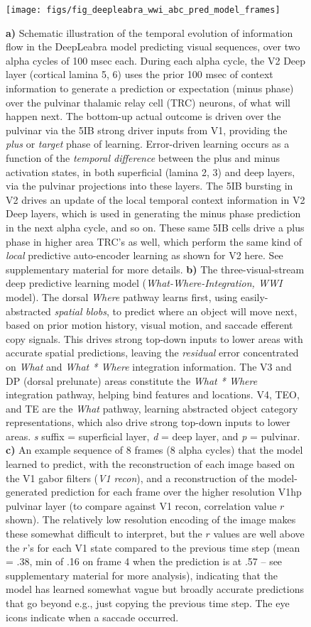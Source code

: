 \documentclass[12pt,twoside]{article}
\newif\myifpdf
\begin{document}
\begin{figure}
  \centering\texttt{[image: figs/fig\_deepleabra\_wwi\_abc\_pred\_model\_frames]}
  \caption{\small {\bf a)} Schematic illustration of the temporal evolution of information flow in the DeepLeabra model predicting visual sequences, over two alpha cycles of 100 msec each.  During each alpha cycle, the V2 Deep layer (cortical lamina 5, 6) uses the prior 100 msec of context information to generate a prediction or expectation (minus phase) over the pulvinar thalamic relay cell (TRC) neurons, of what will happen next.  The bottom-up actual outcome is driven over the pulvinar via the 5IB strong driver inputs from V1, providing the {\em plus} or {\em target} phase of learning.  Error-driven learning occurs as a function of the {\em temporal difference} between the plus and minus activation states, in both superficial (lamina 2, 3) and deep layers, via the pulvinar projections into these layers.  The 5IB bursting in V2 drives an update of the local temporal context information in V2 Deep layers, which is used in generating the minus phase prediction in the next alpha cycle, and so on.  These same 5IB cells drive a plus phase in higher area TRC's as well, which perform the same kind of {\em local} predictive auto-encoder learning as shown for V2 here.  See supplementary material for more details. {\bf b)} The three-visual-stream deep predictive learning model ({\em What-Where-Integration, WWI} model). The dorsal {\em Where} pathway learns first, using easily-abstracted {\em spatial blobs}, to predict where an object will move next, based on prior motion history, visual motion, and saccade efferent copy signals.  This drives strong top-down inputs to lower areas with accurate spatial predictions, leaving the {\em residual} error concentrated on {\em What} and {\em What * Where} integration information.  The V3 and DP (dorsal prelunate) areas constitute the {\em What * Where} integration pathway, helping bind features and locations.  V4, TEO, and TE are the {\em What} pathway, learning abstracted object category representations, which also drive strong top-down inputs to lower areas.  {\em s} suffix = superficial layer, {\em d} = deep layer, and {\em p} = pulvinar. {\bf c)} An example sequence of 8 frames (8 alpha cycles) that the model learned to predict, with the reconstruction of each image based on the V1 gabor filters ({\em V1 recon}), and a reconstruction of the model-generated prediction for each frame over the higher resolution V1hp pulvinar layer (to compare against V1 recon, correlation value $r$ shown).  The relatively low resolution encoding of the image makes these somewhat difficult to interpret, but the $r$ values are well above the $r$'s for each V1 state compared to the previous time step (mean = .38, min of .16 on frame 4 when the prediction is at .57 -- see supplementary material for more analysis), indicating that the model has learned somewhat vague but broadly accurate predictions that go beyond e.g., just copying the previous time step.  The eye icons indicate when a saccade occurred.}
  \label{fig.model}
\end{figure}
\end{document}
